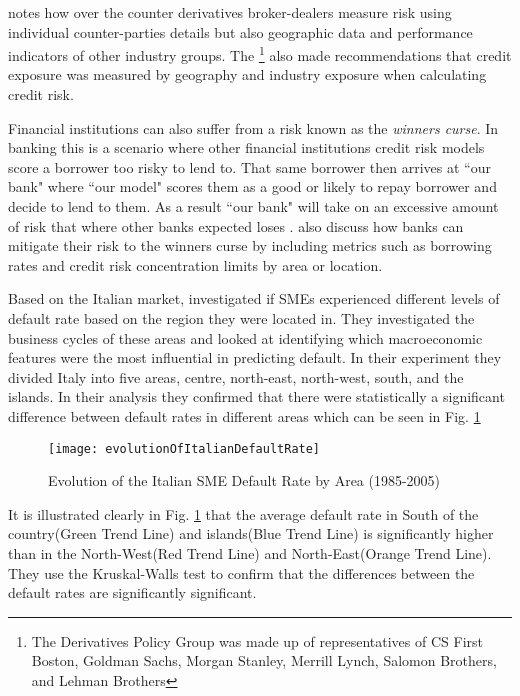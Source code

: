 \cite{fama_term_1986} notes how over the counter derivatives broker-dealers measure risk using individual counter-parties details but also geographic data and performance indicators of other industry groups. The \cite{derivatives_policy_group_framework_1995} \footnote{The Derivatives Policy Group was made up of representatives of CS First Boston, Goldman Sachs, Morgan Stanley, Merrill Lynch, Salomon Brothers, and Lehman Brothers} also made recommendations that credit exposure was measured by geography and industry exposure when calculating credit risk.

Financial institutions can also suffer from a risk known as the \textit{winners curse}. In banking this is a scenario where other financial institutions credit risk models score a borrower too risky to lend to. That same borrower then arrives at ``our bank" where ``our model" scores them as a good or likely to repay borrower and decide to lend to them. As a result ``our bank" will take on an excessive amount of risk that where other banks expected loses \citep{duffie_credit_2012}. \cite{duffie_credit_2012} also discuss how banks can mitigate their risk to the winners curse by including metrics such as borrowing rates and credit risk concentration limits by area or location.

Based on the Italian market, \citep{di_pietro_regional} investigated if SMEs experienced different levels of default rate based on the region they were located in. They investigated the business cycles of these areas and looked at identifying which macroeconomic features were the most influential in predicting default. In their experiment they divided Italy into five areas, centre, north-east, north-west, south, and the islands. In their analysis they confirmed that there were statistically a significant difference between default rates in different areas which can be seen in Fig. \ref{fig:evolutionOfItalianDefaultRate}

\begin{figure}[H]
	\texttt{[image: evolutionOfItalianDefaultRate]}
	\caption{Evolution of the Italian SME Default Rate by Area (1985-2005) \\
	\cite[Source:][]{di_pietro_regional}		
			}
	\label{fig:evolutionOfItalianDefaultRate}
\end{figure}

It is  illustrated clearly in Fig. \ref{fig:evolutionOfItalianDefaultRate} that the average default rate in South of the country(Green Trend Line) and islands(Blue Trend Line) is significantly higher than in the North-West(Red Trend Line) and North-East(Orange Trend Line). They use the Kruskal-Walls test to confirm that the differences between the default rates are significantly significant.

